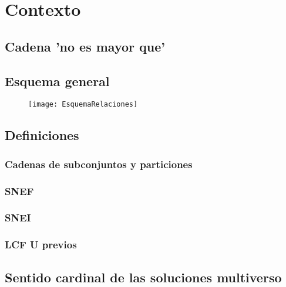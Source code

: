 \chapter{Contexto}

\section{Cadena 'no es mayor que'}

\newpage
\section{Esquema general}
	\begin{figure}[h!]
		\texttt{[image: EsquemaRelaciones]}
		\centering
	\end{figure}

\newpage
\section{Definiciones}
\subsection{Cadenas de subconjuntos y particiones}
\subsection{SNEF}
\subsection{SNEI}
\subsection{LCF U previos}



\newpage
\section{Sentido cardinal de las soluciones multiverso}